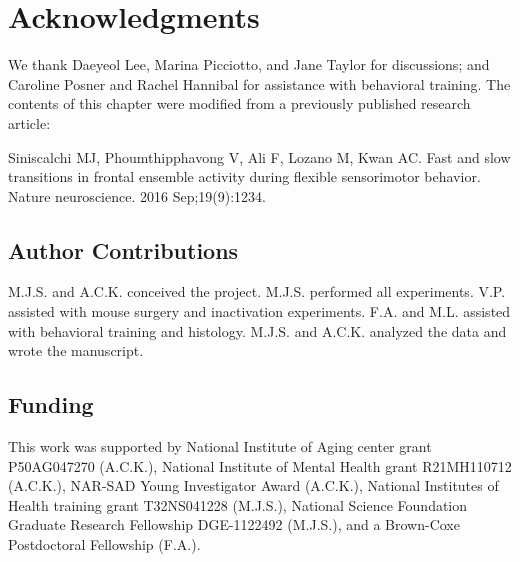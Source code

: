 \section{Acknowledgments}

We thank Daeyeol Lee, Marina Picciotto, and Jane Taylor for discussions; and Caroline Posner and Rachel Hannibal for assistance with behavioral training. The contents of this chapter were modified from a previously published research article: 

\smallskip Siniscalchi MJ, Phoumthipphavong V, Ali F, Lozano M, Kwan AC. Fast and slow transitions in frontal ensemble activity during flexible sensorimotor behavior. Nature neuroscience. 2016 Sep;19(9):1234.

\subsection*{Author Contributions}
M.J.S. and A.C.K. conceived the project. M.J.S. performed all experiments. V.P. assisted with mouse surgery and inactivation experiments. F.A. and M.L. assisted with behavioral training and histology. M.J.S. and A.C.K. analyzed the data and wrote the manuscript.

\subsection*{Funding}
This work was supported by National Institute of Aging center grant P50AG047270 (A.C.K.), National Institute of Mental Health grant R21MH110712 (A.C.K.), NAR-SAD Young Investigator Award (A.C.K.), National Institutes of Health training grant T32NS041228 (M.J.S.), National Science Foundation Graduate Research Fellowship DGE-1122492 (M.J.S.), and a Brown-Coxe Postdoctoral Fellowship (F.A.).

